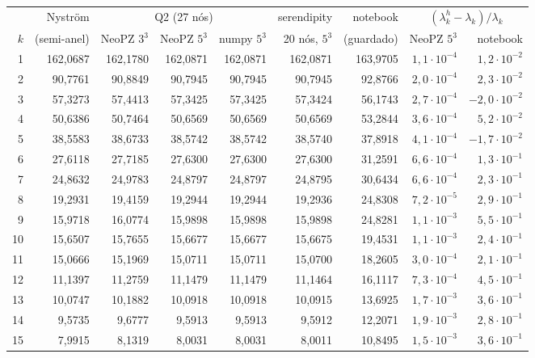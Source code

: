 \begin{tabular}{r r rrr r r rr}
\toprule
 & Nyström & \multicolumn{3}{c}{Q2 (27 nós)} & serendipity & notebook & \multicolumn{2}{c}{$(\lambda_k^h - \lambda_k)/\lambda_k$} \\
\cmidrule(lr){3-5}\cmidrule(lr){8-9}
$k$ & (semi-anel) & NeoPZ $3^3$ & NeoPZ $5^3$ & numpy $5^3$ & 20 nós, $5^3$ & (guardado) & NeoPZ $5^3$ & notebook \\
\midrule
1 & 162,0687 & 162,1780 & 162,0871 & 162,0871 & 162,0871 & 163,9705 & $1{,}1\cdot10^{-4}$ & $1{,}2\cdot10^{-2}$ \\
2 & 90,7761 & 90,8849 & 90,7945 & 90,7945 & 90,7945 & 92,8766 & $2{,}0\cdot10^{-4}$ & $2{,}3\cdot10^{-2}$ \\
3 & 57,3273 & 57,4413 & 57,3425 & 57,3425 & 57,3424 & 56,1743 & $2{,}7\cdot10^{-4}$ & $-2{,}0\cdot10^{-2}$ \\
4 & 50,6386 & 50,7464 & 50,6569 & 50,6569 & 50,6569 & 53,2844 & $3{,}6\cdot10^{-4}$ & $5{,}2\cdot10^{-2}$ \\
5 & 38,5583 & 38,6733 & 38,5742 & 38,5742 & 38,5740 & 37,8918 & $4{,}1\cdot10^{-4}$ & $-1{,}7\cdot10^{-2}$ \\
6 & 27,6118 & 27,7185 & 27,6300 & 27,6300 & 27,6300 & 31,2591 & $6{,}6\cdot10^{-4}$ & $1{,}3\cdot10^{-1}$ \\
7 & 24,8632 & 24,9783 & 24,8797 & 24,8797 & 24,8795 & 30,6434 & $6{,}6\cdot10^{-4}$ & $2{,}3\cdot10^{-1}$ \\
8 & 19,2931 & 19,4159 & 19,2944 & 19,2944 & 19,2936 & 24,8308 & $7{,}2\cdot10^{-5}$ & $2{,}9\cdot10^{-1}$ \\
9 & 15,9718 & 16,0774 & 15,9898 & 15,9898 & 15,9898 & 24,8281 & $1{,}1\cdot10^{-3}$ & $5{,}5\cdot10^{-1}$ \\
10 & 15,6507 & 15,7655 & 15,6677 & 15,6677 & 15,6675 & 19,4531 & $1{,}1\cdot10^{-3}$ & $2{,}4\cdot10^{-1}$ \\
11 & 15,0666 & 15,1969 & 15,0711 & 15,0711 & 15,0700 & 18,2605 & $3{,}0\cdot10^{-4}$ & $2{,}1\cdot10^{-1}$ \\
12 & 11,1397 & 11,2759 & 11,1479 & 11,1479 & 11,1464 & 16,1117 & $7{,}3\cdot10^{-4}$ & $4{,}5\cdot10^{-1}$ \\
13 & 10,0747 & 10,1882 & 10,0918 & 10,0918 & 10,0915 & 13,6925 & $1{,}7\cdot10^{-3}$ & $3{,}6\cdot10^{-1}$ \\
14 & 9,5735 & 9,6777 & 9,5913 & 9,5913 & 9,5912 & 12,2071 & $1{,}9\cdot10^{-3}$ & $2{,}8\cdot10^{-1}$ \\
15 & 7,9915 & 8,1319 & 8,0031 & 8,0031 & 8,0011 & 10,8495 & $1{,}5\cdot10^{-3}$ & $3{,}6\cdot10^{-1}$ \\

\end{tabular}

